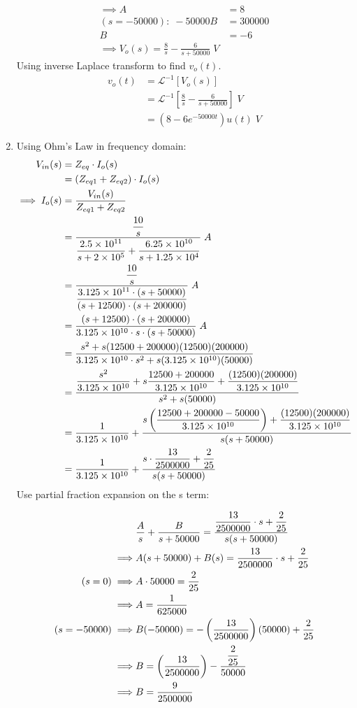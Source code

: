 \begin{enumerate}
{\begin{align*}
		\implies A &= 8\\
		(s = -50000): \;  -50000B &= 300000\\
		B &= -6\\
		\implies V_o(s) = \frac{8}{s} - \frac{6}{s + 50000} \; V
		\end{align*}
		Using inverse Laplace transform to find $v_o(t)$.
		\begin{align*}
		v_o(t) &= \mathcal{L}^{-1} [V_o(s)]\\
		&= \mathcal{L}^{-1} \left[\frac{8}{s} - \frac{6}{s + 50000}\right]\; V\\
		&= (8 -6 e^{-50000t})u(t)\;V
		\end{align*}
	}
	\item{
		Using Ohm's Law in frequency domain:
		\begin{align*}
		V_{in}(s) &= Z_{eq} \cdot I_o(s)\\
		&= (Z_{eq1} + Z_{eq2}) \cdot I_o(s)\\
		\implies I_o(s) &= \frac{V_{in}(s)}{Z_{eq1} + Z_{eq2}}\\
		&= \frac{\dfrac{10}{s}} 
		{\dfrac{2.5 \times 10^{11}}
		{s + 2 \times 10^5} + \dfrac{6.25 \times 10^{10}}{s + 1.25 \times 10^4}} \; A\\
		&= \frac{\dfrac{10}{s}} 
		{\dfrac{3.125 \times 10^{11} \cdot (s + 50000)}{(s+12500)\cdot(s+200000)}} \; A\\
		&= \frac{(s+12500)\cdot(s+200000)}{3.125\times 10^{10} \cdot s \cdot (s + 50000)} \; A\\
		&= \frac{s^2 + s(12500 + 200000) (12500)(200000)}
		{3.125\times 10^{10} \cdot s^2 + s(3.125\times 10^{10})(50000)}\\
		&= \frac{\dfrac{s^2}{3.125\times 10^{10}} + s \dfrac{12500 + 200000}{3.125\times 10^{10}} + \dfrac{(12500)(200000)}{3.125\times 10^{10}}}{s^2 + s (50000)}\\
		&= \frac{1}{3.125\times 10^{10}} + \frac{s\left(\dfrac{12500+200000-50000}{3.125\times 10^{10}}\right) + \dfrac{(12500)(200000)}{3.125\times 10^{10}}}{s(s+50000)}\\
		&= \frac{1}{3.125\times 10^{10}} + \frac{s \cdot \dfrac{13}{2500000} + \dfrac{2}{25} }{s(s+50000)} 
		\end{align*}
		Use partial fraction expansion on the s term:
		
		\begin{align*}
		&\frac{A}{s} + \frac{B}{s + 50000} = \frac{\dfrac{13}{2500000} \cdot s + \dfrac{2}{25}}{s(s + 50000)}\\
		\implies &A(s + 50000) + B(s) = \dfrac{13}{2500000} \cdot s + \dfrac{2}{25}\\
		(s = 0) \implies &A \cdot 50000 = \dfrac{2}{25}\\
		\implies &A = \frac{1}{625000}\\
		(s = -50000) \implies &B(-50000) = -\left(\dfrac{13}{2500000}\right)(50000) + \dfrac{2}{25}\\
		\implies &B = \left( \dfrac{13}{2500000} \right) - \frac{\dfrac{2}{25}}{50000}\\
		\implies &B = \frac{9}{2500000}
		\end{align*}				
			
}
\end{enumerate}
